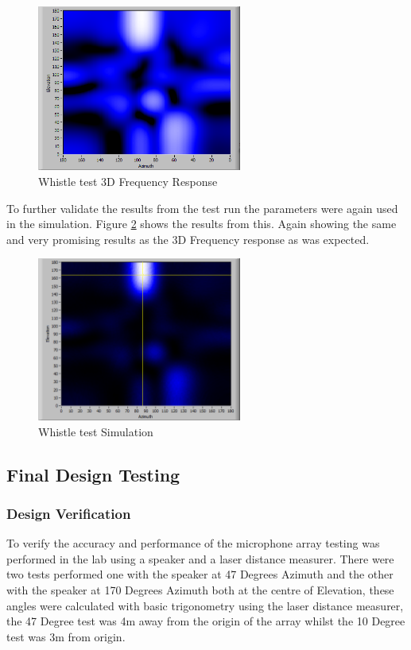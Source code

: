 \documentclass{UoNMCHA}
\numberwithin{equation}{section}
\begin{document}
    \begin{figure} [H]
        \centering
        \includegraphics[keepaspectratio, width = 0.6\textwidth]{Figures/RealWhistle3DFreqResp.png}
        \caption{Whistle test 3D Frequency Response}
        \label{fig:RealWhistleFreq}
    \end{figure}
    
    To further validate the results from the test run the parameters were again used in the simulation. Figure \ref{fig:RealWhistleSim} shows the results from this. Again showing the same and very promising results as the 3D Frequency response as was expected.
    
     \begin{figure} [H]
        \centering
        \includegraphics[keepaspectratio, width = 0.6\textwidth]{Figures/RealWhistleSim.png}
        \caption{Whistle test Simulation}
        \label{fig:RealWhistleSim}
    \end{figure}
    
\subsection{Final Design Testing} \label{sec:Second Array Testing}
\subsubsection{Design Verification} \label{sec:Design Verification Testing}
    To verify the accuracy and performance of the microphone array testing was performed in the lab using a speaker and a laser distance measurer. There were two tests performed one with the speaker at 47 Degrees Azimuth and the other with the speaker at 170 Degrees Azimuth both at the centre of Elevation, these angles were calculated with basic trigonometry using the laser distance measurer, the 47 Degree test was 4m away from the origin of the array whilst the 10 Degree test was 3m from origin.
\end{document}
